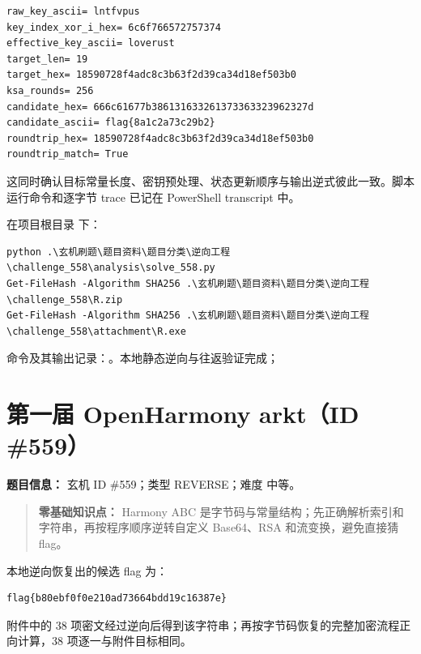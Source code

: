 \begin{verbatim}
raw_key_ascii= lntfvpus
key_index_xor_i_hex= 6c6f766572757374
effective_key_ascii= loverust
target_len= 19
target_hex= 18590728f4adc8c3b63f2d39ca34d18ef503b0
ksa_rounds= 256
candidate_hex= 666c61677b386131633261373363323962327d
candidate_ascii= flag{8a1c2a73c29b2}
roundtrip_hex= 18590728f4adc8c3b63f2d39ca34d18ef503b0
roundtrip_match= True
\end{verbatim}

这同时确认目标常量长度、密钥预处理、状态更新顺序与输出逆式彼此一致。脚本运行命令和逐字节 trace 已记在 PowerShell transcript 中。

在项目根目录 \texttt{} 下：

\begin{verbatim}
python .\玄机刷题\题目资料\题目分类\逆向工程\challenge_558\analysis\solve_558.py
Get-FileHash -Algorithm SHA256 .\玄机刷题\题目资料\题目分类\逆向工程\challenge_558\R.zip
Get-FileHash -Algorithm SHA256 .\玄机刷题\题目资料\题目分类\逆向工程\challenge_558\attachment\R.exe
\end{verbatim}

命令及其输出记录：\texttt{}。本地静态逆向与往返验证完成；

\section{第一届 OpenHarmony arkt（ID \#559）}\label{ux7b2cux4e00ux5c4a-openharmony-arktid-559}

\textbf{题目信息：} 玄机 ID \#559；类型 REVERSE；难度 中等。

\begin{quote}
\textbf{零基础知识点：} Harmony ABC 是字节码与常量结构；先正确解析索引和字符串，再按程序顺序逆转自定义 Base64、RSA 和流变换，避免直接猜 flag。
\end{quote}

本地逆向恢复出的候选 flag 为：

\begin{verbatim}
flag{b80ebf0f0e210ad73664bdd19c16387e}
\end{verbatim}

附件中的 38 项密文经过逆向后得到该字符串；再按字节码恢复的完整加密流程正向计算，38 项逐一与附件目标相同。

